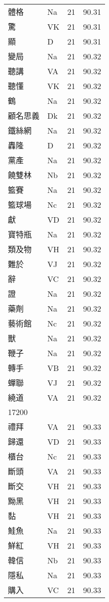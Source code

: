 \documentclass[twocolumn]{book}
\begin{document}
\begin{supertabular}{llrr}
體格 & Na & 21 &  90.31\\
驚 & VK & 21 &  90.31\\
顯 & D & 21 &  90.31\\
變局 & Na & 21 &  90.32\\
聽講 & VA & 21 &  90.32\\
聽懂 & VK & 21 &  90.32\\
鶴 & Na & 21 &  90.32\\
顧名思義 & Dk & 21 &  90.32\\
鐵絲網 & Na & 21 &  90.32\\
轟隆 & D & 21 &  90.32\\
黨產 & Na & 21 &  90.32\\
饒雙林 & Nb & 21 &  90.32\\
籃賽 & Na & 21 &  90.32\\
籃球場 & Nc & 21 &  90.32\\
獻 & VD & 21 &  90.32\\
寶特瓶 & Na & 21 &  90.32\\
類及物 & VH & 21 &  90.32\\
難於 & VJ & 21 &  90.32\\
辭 & VC & 21 &  90.32\\
證 & Na & 21 &  90.32\\
藥劑 & Na & 21 &  90.32\\
藝術館 & Nc & 21 &  90.32\\
獸 & Na & 21 &  90.32\\
鞭子 & Na & 21 &  90.32\\
轉手 & VB & 21 &  90.32\\
蟬聯 & VJ & 21 &  90.32\\
繞道 & VA & 21 &  90.32\\
17200\\
禮拜 & VA & 21 &  90.33\\
歸還 & VD & 21 &  90.33\\
櫃台 & Nc & 21 &  90.33\\
斷頭 & VA & 21 &  90.33\\
斷交 & VH & 21 &  90.33\\
黝黑 & VH & 21 &  90.33\\
黏 & VH & 21 &  90.33\\
鮭魚 & Na & 21 &  90.33\\
鮮紅 & VH & 21 &  90.33\\
韓信 & Nb & 21 &  90.33\\
隱私 & Na & 21 &  90.33\\
購入 & VC & 21 &  90.33\\

\end{supertabular}
\end{document}
